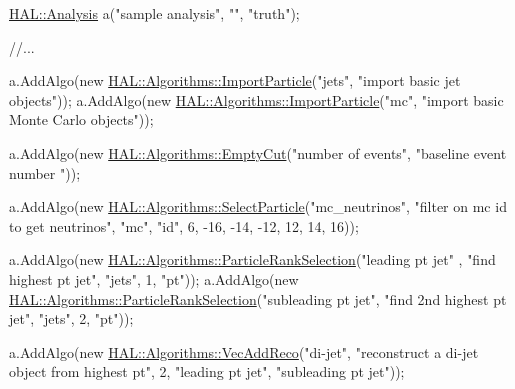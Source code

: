 \begin{DoxyCode}
\hyperlink{class_h_a_l_1_1_analysis}{HAL::Analysis} a(\textcolor{stringliteral}{"sample analysis"}, \textcolor{stringliteral}{""}, \textcolor{stringliteral}{"truth"});

\textcolor{comment}{//...}

a.AddAlgo(\textcolor{keyword}{new} \hyperlink{class_h_a_l_1_1_algorithms_1_1_import_particle}{HAL::Algorithms::ImportParticle}(\textcolor{stringliteral}{"jets"}, \textcolor{stringliteral}{"import basic jet
       objects"}));
a.AddAlgo(\textcolor{keyword}{new} \hyperlink{class_h_a_l_1_1_algorithms_1_1_import_particle}{HAL::Algorithms::ImportParticle}(\textcolor{stringliteral}{"mc"}, \textcolor{stringliteral}{"import basic Monte
       Carlo objects"}));

a.AddAlgo(\textcolor{keyword}{new} \hyperlink{class_h_a_l_1_1_algorithms_1_1_empty_cut}{HAL::Algorithms::EmptyCut}(\textcolor{stringliteral}{"number of events"}, \textcolor{stringliteral}{"baseline event number
      "}));

a.AddAlgo(\textcolor{keyword}{new} \hyperlink{class_h_a_l_1_1_algorithms_1_1_select_particle}{HAL::Algorithms::SelectParticle}(\textcolor{stringliteral}{"mc\_neutrinos"}, \textcolor{stringliteral}{"filter on mc
       id to get neutrinos"}, 
                                              \textcolor{stringliteral}{"mc"},
                                              \textcolor{stringliteral}{"id"}, 6,
                                              -16, -14, -12, 12, 14, 16));

a.AddAlgo(\textcolor{keyword}{new} \hyperlink{class_h_a_l_1_1_algorithms_1_1_particle_rank_selection}{HAL::Algorithms::ParticleRankSelection}(\textcolor{stringliteral}{"leading pt jet"}
      , \textcolor{stringliteral}{"find highest pt jet"}, 
                                                     \textcolor{stringliteral}{"jets"},
                                                     1, \textcolor{stringliteral}{"pt"}));
a.AddAlgo(\textcolor{keyword}{new} \hyperlink{class_h_a_l_1_1_algorithms_1_1_particle_rank_selection}{HAL::Algorithms::ParticleRankSelection}(\textcolor{stringliteral}{"subleading pt
       jet"}, \textcolor{stringliteral}{"find 2nd highest pt jet"}, 
                                                     \textcolor{stringliteral}{"jets"},
                                                     2, \textcolor{stringliteral}{"pt"}));

a.AddAlgo(\textcolor{keyword}{new} \hyperlink{class_h_a_l_1_1_algorithms_1_1_vec_add_reco}{HAL::Algorithms::VecAddReco}(\textcolor{stringliteral}{"di-jet"}, \textcolor{stringliteral}{"reconstruct a di-jet object
       from highest pt"}, 
                                          2, \textcolor{stringliteral}{"leading pt jet"}, \textcolor{stringliteral}{"subleading pt jet"}));


\end{DoxyCode}
